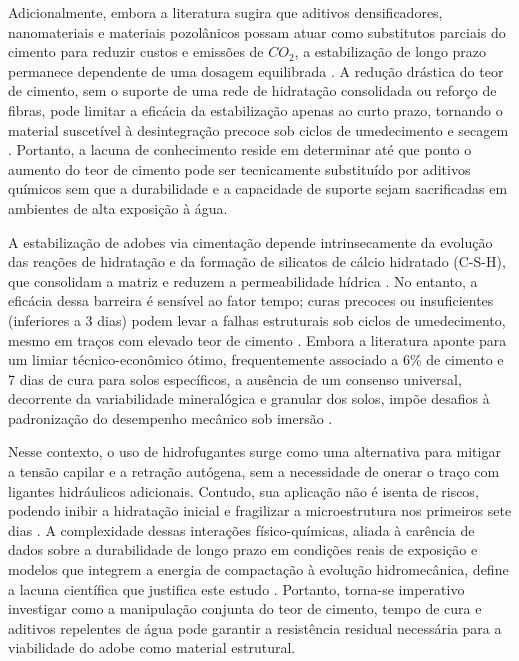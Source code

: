 Adicionalmente, embora a literatura sugira que aditivos densificadores, nanomateriais e materiais pozolânicos possam atuar como substitutos parciais do cimento para reduzir custos e emissões de $CO_2$, a estabilização de longo prazo permanece dependente de uma dosagem equilibrada \cite{Zhang2025, Jahandari2023, Dormohamadi2024, Wahabi2021}. A redução drástica do teor de cimento, sem o suporte de uma rede de hidratação consolidada ou reforço de fibras, pode limitar a eficácia da estabilização apenas ao curto prazo, tornando o material suscetível à desintegração precoce sob ciclos de umedecimento e secagem \cite{Wahabi2021}. Portanto, a lacuna de conhecimento reside em determinar até que ponto o aumento do teor de cimento pode ser tecnicamente substituído por aditivos químicos sem que a durabilidade e a capacidade de suporte sejam sacrificadas em ambientes de alta exposição à água.


A estabilização de adobes via cimentação depende intrinsecamente da evolução das reações de hidratação e da formação de silicatos de cálcio hidratado (C-S-H), que consolidam a matriz e reduzem a permeabilidade hídrica \cite{Dao2018}. No entanto, a eficácia dessa barreira é sensível ao fator tempo; curas precoces ou insuficientes (inferiores a 3 dias) podem levar a falhas estruturais sob ciclos de umedecimento, mesmo em traços com elevado teor de cimento \cite{Wahabi2021, Nshimiyimana2020, Yang2024}. Embora a literatura aponte para um limiar técnico-econômico ótimo, frequentemente associado a 6\% de cimento e 7 dias de cura para solos específicos, a ausência de um consenso universal, decorrente da variabilidade mineralógica e granular dos solos, impõe desafios à padronização do desempenho mecânico sob imersão \cite{Abdallah2023, Wahabi2021}.

Nesse contexto, o uso de hidrofugantes surge como uma alternativa para mitigar a tensão capilar e a retração autógena, sem a necessidade de onerar o traço com ligantes hidráulicos adicionais. Contudo, sua aplicação não é isenta de riscos, podendo inibir a hidratação inicial e fragilizar a microestrutura nos primeiros sete dias \cite{Lu2023}. A complexidade dessas interações físico-químicas, aliada à carência de dados sobre a durabilidade de longo prazo em condições reais de exposição e modelos que integrem a energia de compactação à evolução hidromecânica, define a lacuna científica que justifica este estudo \cite{Abdallah2023, Jahandari2023, Rosicki2022}. Portanto, torna-se imperativo investigar como a manipulação conjunta do teor de cimento, tempo de cura e aditivos repelentes de água pode garantir a resistência residual necessária para a viabilidade do adobe como material estrutural.

